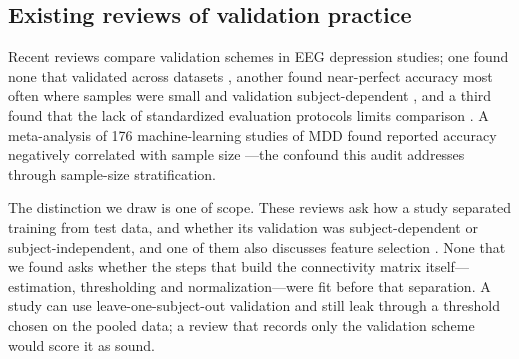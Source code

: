 \subsection{Existing reviews of validation practice}
Recent reviews compare validation schemes in EEG depression studies; one found none that validated across datasets \cite{lin2024}, another found near-perfect accuracy most often where samples were small and validation subject-dependent \cite{lunaguevara2026}, and a third found that the lack of standardized evaluation protocols limits comparison \cite{kaur2025}. A meta-analysis of 176 machine-learning studies of MDD found reported accuracy negatively correlated with sample size \cite{zhang2025}---the confound this audit addresses through sample-size stratification.

The distinction we draw is one of scope. These reviews ask how a study separated training from test data, and whether its validation was subject-dependent or subject-independent, and one of them also discusses feature selection \cite{lunaguevara2026}. None that we found asks whether the steps that build the connectivity matrix itself---estimation, thresholding and normalization---were fit before that separation. A study can use leave-one-subject-out validation and still leak through a threshold chosen on the pooled data; a review that records only the validation scheme would score it as sound.

